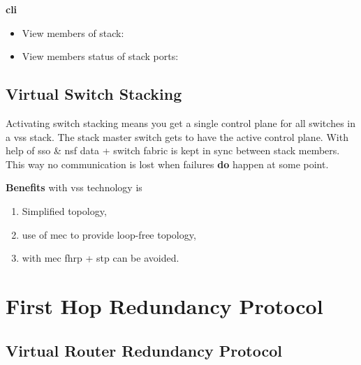 \textbf{\gls{cli}}

\begin{itemize}
    \item View members of stack: 
    \item View members status of stack ports: 
\end{itemize}

\newpage

\subsection[VSS]{Virtual Switch Stacking}

Activating switch stacking means you get a single control plane for all 
switches in a \gls{vss} stack. The stack master switch gets to have the active 
control plane. With help of \gls{sso} \& \gls{nsf} data + switch fabric is kept 
in sync between stack members. This way no communication is lost when failures 
\textbf{do} happen at some point.


\textbf{Benefits} with \gls{vss} technology is
\begin{enumerate}
    \item Simplified topology,
    \item use of \gls{mec} to provide loop-free topology,
    \item with \gls{mec} \gls{fhrp} + \gls{stp} can be avoided.
\end{enumerate}

\section[FHRP]{First Hop Redundancy Protocol}


\newpage

\subsection[VRRP]{Virtual Router Redundancy Protocol}

